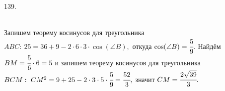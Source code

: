 139. \begin{figure}[ht!]
\end{figure}\\
Запишем теорему косинусов для треугольника $ABC:\ 25=36+9-2\cdot6\cdot3\cdot\cos(\angle B),$ откуда $\cos(\angle B)=\cfrac{5}{9}.$ Найдём $BM=\cfrac{5}{6}\cdot6=5$ и запишем теорему косинусов для треугольника $BCM:\ CM^2=9+25-2\cdot3\cdot5\cdot\cfrac{5}{9}=\cfrac{52}{3},$ значит $CM=\cfrac{2\sqrt{39}}{3}.$\\
